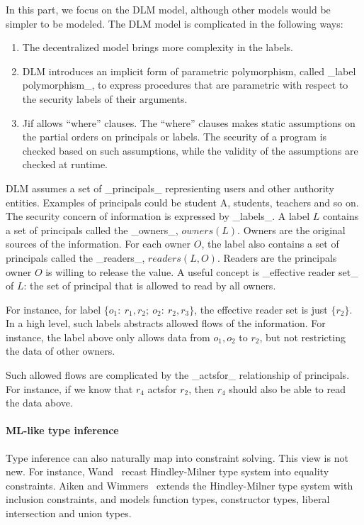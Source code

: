 In this part, we focus on the DLM model, although other models would be simpler
to be modeled. The DLM model is complicated in the following ways:

\begin{enumerate}
\item The decentralized model brings more complexity in the labels.

\item DLM introduces an implicit form of parametric polymorphism, called _label
polymorphism_, to express procedures that are parametric with respect to the
security labels of their arguments.

\item Jif allows ``where'' clauses. The ``where'' clauses makes static
assumptions on the partial orders on principals or labels. The security of a
program is checked based on such assumptions, while the validity of the
assumptions are checked at runtime. 
\end{enumerate}

DLM assumes a set of _principals_ represienting users and other
authority entities. Examples of principals could be student A,
students, teachers and so on. The security concern of information is
expressed by _labels_. A label $L$ contains a set of principals called
the _owners_, $owners(L)$. Owners are the original sources of the
information. For each owner $O$, the label also contains a set of
principals called the _readers_, $readers(L,O)$. Readers are the
principals owner $O$ is willing to release the value. A useful concept
is _effective reader set_ of $L$: the set of principal that is allowed
to read by all owners.

For instance, for label $\{o_1:\ r_1,r_2;\ o_2:\ r_2,r_3\}$, the
effective reader set is just $\{r_2\}$. In a high level, such labels
abstracts allowed flows of the information. For instance, the label
above only allows data from $o_1, o_2$ to $r_2$, but not restricting
the data of other owners.

Such allowed flows are complicated by the _actsfor_ relationship of
principals. For instance, if we know that $r_4$ actsfor $r_2$, then
$r_4$ should also be able to read the data above.

\paragraph{ML-like type inference}

Type inference can also naturally map into constraint solving. This
view is not new. For instance, Wand~\cite{wand-typeinference} recast
Hindley-Milner type system into equality constraints. Aiken and
Wimmers~\cite{aiken-typeinclusion} extends the Hindley-Milner type
system with inclusion constraints, and models function types,
constructor types, liberal intersection and union types. 


